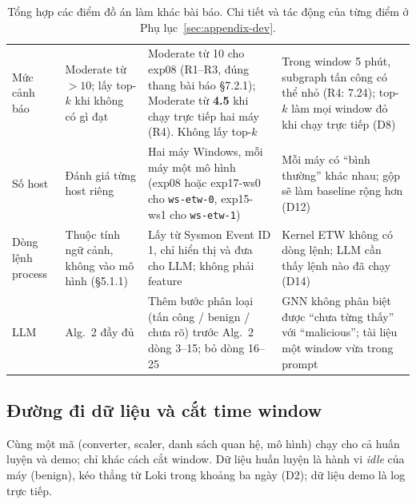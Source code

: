 \begin{table}[H]
\begin{tabularx}{\textwidth}{>{\raggedright\arraybackslash}p{2.1cm} >{\raggedright\arraybackslash}X >{\raggedright\arraybackslash}X >{\raggedright\arraybackslash}X}
Mức cảnh báo & Moderate từ $>10$; lấy top-$k$ khi không có gì đạt & Moderate từ 10 cho exp08 (R1--R3, đúng thang bài báo §7.2.1); Moderate từ \textbf{4.5} khi chạy trực tiếp hai máy (R4). Không lấy top-$k$ & Trong window 5 phút, subgraph tấn công có thể nhỏ (R4: 7.24); top-$k$ làm mọi window đỏ khi chạy trực tiếp (D8) \\
Số host & Đánh giá từng host riêng & Hai máy Windows, mỗi máy một mô hình (exp08 hoặc exp17-ws0 cho \texttt{ws-etw-0}, exp15-ws1 cho \texttt{ws-etw-1}) & Mỗi máy có ``bình thường'' khác nhau; gộp sẽ làm baseline rộng hơn (D12) \\
Dòng lệnh process & Thuộc tính ngữ cảnh, không vào mô hình (§5.1.1) & Lấy từ Sysmon Event ID 1, chỉ hiển thị và đưa cho LLM; không phải feature & Kernel ETW không có dòng lệnh; LLM cần thấy lệnh nào đã chạy (D14) \\
LLM & Alg.~2 đầy đủ & Thêm bước phân loại (tấn công / benign / chưa rõ) trước Alg.~2 dòng 3--15; bỏ dòng 16--25 & GNN không phân biệt được ``chưa từng thấy'' với ``malicious''; tài liệu một window vừa trong prompt \\
\bottomrule
\end{tabularx}
\caption{Tổng hợp các điểm đồ án làm khác bài báo. Chi tiết và tác động của từng điểm ở Phụ lục~\ref{sec:appendix-dev}.}
\label{tab:deviations}
\end{table}

\subsection{Đường đi dữ liệu và cắt time window}
\label{sec:dev-window}

Cùng một mã (converter, scaler, danh sách quan hệ, mô hình) chạy cho cả huấn luyện và demo; chỉ khác cách cắt window. Dữ liệu huấn luyện là hành vi \emph{idle} của máy (benign), kéo thẳng từ Loki trong khoảng ba ngày (D2); dữ liệu demo là log trực tiếp.

